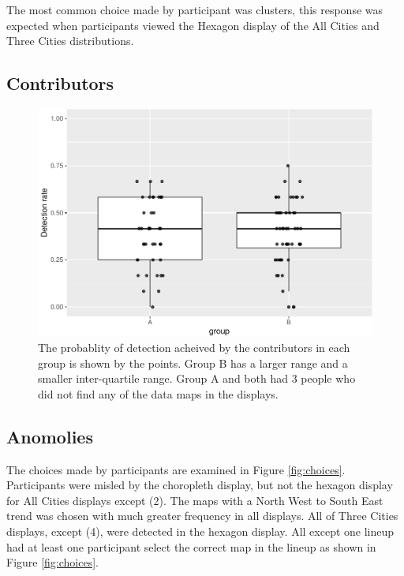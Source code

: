 \documentclass[conference,final,]{IEEEtran}
\makeatletter
\def\maxwidth{\ifdim\Gin@nat@width>\linewidth\linewidth
\else\Gin@nat@width\fi}
\let\Oldincludegraphics\includegraphics
\renewcommand{\includegraphics}[1]{\Oldincludegraphics[width=\maxwidth]{#1}}
\makeatother
\begin{document}
The most common choice made by participant was clusters, this response
was expected when participants viewed the Hexagon display of the All
Cities and Three Cities distributions.

\hypertarget{contributors}{%
\subsection{Contributors}\label{contributors}}

\begin{figure}
\centering
\includegraphics{paper_files/figure-latex/contributors-1.pdf}
\caption{The probablity of detection acheived by the contributors in
each group is shown by the points. Group B has a larger range and a
smaller inter-quartile range. Group A and both had 3 people who did not
find any of the data maps in the displays.}
\end{figure}

\hypertarget{anomolies}{%
\subsection{Anomolies}\label{anomolies}}

The choices made by participants are examined in Figure
\ref{fig:choices}. Participants were misled by the choropleth display,
but not the hexagon display for All Cities displays except (2). The maps
with a North West to South East trend was chosen with much greater
frequency in all displays. All of Three Cities displays, except (4),
were detected in the hexagon display. All except one lineup had at least
one participant select the correct map in the lineup as shown in Figure
\ref{fig:choices}.
\end{document}
